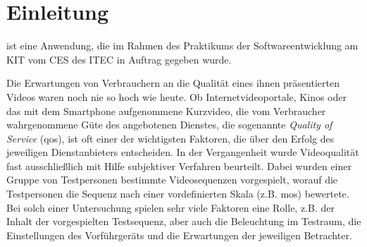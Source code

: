 \chapter{Einleitung}

\projektTitel ist eine Anwendung, die im Rahmen des Praktikums der Softwareentwicklung am \gls{KIT} vom
\gls{CES} des \gls{ITEC} in Auftrag gegeben wurde.

Die Erwartungen von Verbrauchern an die Qualität eines ihnen präsentierten Videos waren noch nie so hoch wie
heute. Ob Internetvideoportale, Kinos oder das mit dem Smartphone aufgenommene Kurzvideo, die
vom Verbraucher wahrgenommene Güte des angebotenen Dienstes, die sogenannte \emph{Quality of Service} (\gls{qos}), ist oft einer der wichtigsten Faktoren, die über den Erfolg des jeweiligen Dienstanbieters entscheiden. 
In der Vergangenheit wurde Videoqualität fast ausschließlich mit Hilfe subjektiver Verfahren beurteilt. Dabei wurden einer Gruppe von Testpersonen bestimmte Videosequenzen vorgespielt, worauf die Testpersonen
die Sequenz nach einer vordefinierten Skala (z.B. \gls{mos}) bewertete. Bei solch einer Untersuchung
spielen sehr viele Faktoren eine Rolle, z.B. der Inhalt der vorgespielten Testsequenz, aber auch die Beleuchtung im Testraum, die Einstellungen des Vorführgeräts und die Erwartungen der jeweiligen Betrachter.

